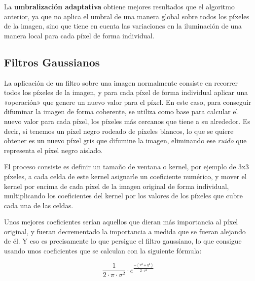 La \textbf{umbralización adaptativa} obtiene mejores resultados que el algoritmo anterior, ya que no aplica el umbral de una manera global sobre todos los píxeles de la imagen, sino que tiene en cuenta las variaciones en la iluminación de una manera local para cada píxel de forma individual. 


\subsection{Filtros Gaussianos}
La aplicación de un filtro sobre una imagen normalmente consiste en recorrer todos los píxeles de la imagen, y para cada píxel de forma individual aplicar una «operación» que genere un nuevo valor para el píxel. En este caso, para conseguir difuminar la imagen de forma coherente, se utiliza como base para calcular el nuevo valor para cada píxel, los píxeles más cercanos que tiene a su alrededor. Es decir, si tenemos un píxel negro rodeado de píxeles blancos, lo que se quiere obtener es un nuevo píxel gris que difumine la imagen, eliminando ese \textit{ruido} que representa el píxel negro aislado.

El proceso consiste es definir un tamaño de ventana o kernel, por ejemplo de 3x3 píxeles, a cada celda de este kernel asignarle un coeficiente numérico, y mover el kernel por encima de cada píxel de la imagen original de forma individual, multiplicando los coeficientes del kernel por los valores de los píxeles que cubre cada una de las celdas.

Unos mejores coeficientes serían aquellos que dieran más importancia al píxel original, y fueran decrementado la importancia a medida que se fueran alejando de él. Y eso es precisamente lo que persigue el filtro gaussiano, lo que consigue usando unos coeficientes que se calculan con la siguiente fórmula:

\begin{equation}
  \frac{1}{2 \cdot \pi \cdot \sigma^{2}} \cdot e^{\frac{-(x^2 + y^2)}{2 \cdot \sigma^{2}}}
\end{equation}

